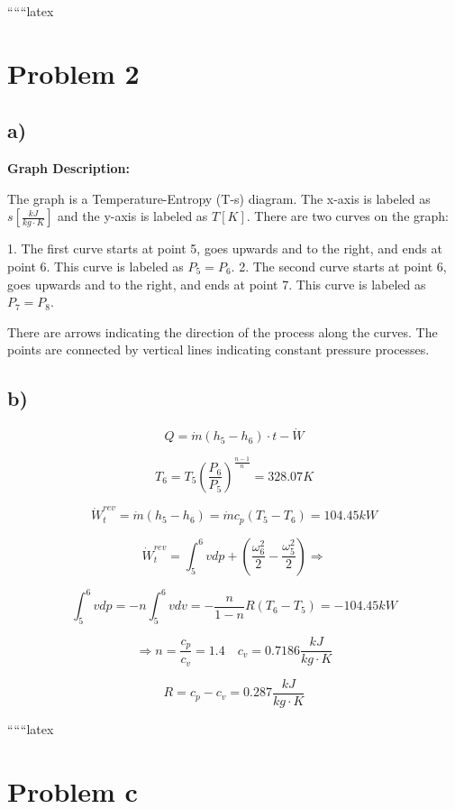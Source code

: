 
``````latex


\section*{Problem 2}

\subsection*{a)}

\begin{center}
\textbf{Graph Description:}
\end{center}

The graph is a Temperature-Entropy (T-s) diagram. The x-axis is labeled as $s \left[\frac{kJ}{kg \cdot K}\right]$ and the y-axis is labeled as $T \left[K\right]$. There are two curves on the graph:

1. The first curve starts at point 5, goes upwards and to the right, and ends at point 6. This curve is labeled as $P_5 = P_6$.
2. The second curve starts at point 6, goes upwards and to the right, and ends at point 7. This curve is labeled as $P_7 = P_8$.

There are arrows indicating the direction of the process along the curves. The points are connected by vertical lines indicating constant pressure processes.

\subsection*{b)}

\[
Q = \dot{m} (h_5 - h_6) \cdot t - \dot{W}
\]

\[
T_6 = T_5 \left( \frac{P_6}{P_5} \right)^{\frac{n-1}{n}} = 328.07 K
\]

\[
\dot{W}_{t}^{rev} = \dot{m} (h_5 - h_6) = \dot{m} c_p (T_5 - T_6) = 104.45 kW
\]

\[
\dot{W}_{t}^{rev} = \int_{5}^{6} v dp + \left( \frac{\omega_6^2}{2} - \frac{\omega_5^2}{2} \right) \Rightarrow
\]

\[
\int_{5}^{6} v dp = -n \int_{5}^{6} v dv = -\frac{n}{1-n} R (T_6 - T_5) = -104.45 kW
\]

\[
\Rightarrow n = \frac{c_p}{c_v} = 1.4 \quad c_v = 0.7186 \frac{kJ}{kg \cdot K}
\]

\[
R = c_p - c_v = 0.287 \frac{kJ}{kg \cdot K}
\]

``````latex


\section*{Problem c}

